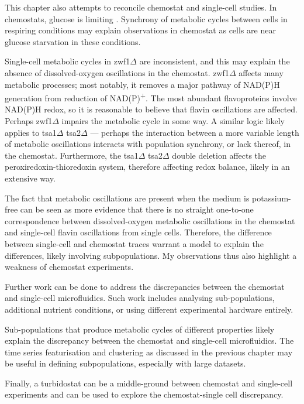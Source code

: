 This chapter also attempts to reconcile chemostat and single-cell studies.
In chemostats, glucose is limiting \parencite{jonesCyberneticModelGrowth1999}.
Synchrony of metabolic cycles between cells in respiring conditions may explain observations in chemostat as cells are near glucose starvation in these conditions.

Single-cell metabolic cycles in zwf1$\Delta$ are inconsistent, and this may explain the absence of dissolved-oxygen oscillations in the chemostat.
zwf1$\Delta$ affects many metabolic processes; most notably, it removes a major pathway of NAD(P)H generation from reduction of NAD(P)\textsuperscript{+}.
The most abundant flavoproteins involve NAD(P)H redox, so it is reasonable to believe that flavin oscillations are affected.
Perhaps zwf1$\Delta$ impairs the metabolic cycle in some way.
A similar logic likely applies to tsa1$\Delta$ tsa2$\Delta$ --- perhaps the interaction between a more variable length of metabolic oscillations interacts with population synchrony, or lack thereof, in the chemostat.
Furthermore, the tsa1$\Delta$ tsa2$\Delta$ double deletion affects the peroxiredoxin-thioredoxin system, therefore affecting redox balance, likely in an extensive way.

The fact that metabolic oscillations are present when the medium is potassium-free can be seen as more evidence that there is no straight one-to-one correspondence between dissolved-oxygen metabolic oscillations in the chemostat and single-cell flavin oscillations from single cells.
Therefore, the difference between single-cell and chemostat traces warrant a model to explain the differences, likely involving subpopulations.
My observations thus also highlight a weakness of chemostat experiments.




Further work can be done to address the discrepancies between the chemostat and single-cell microfluidics.
Such work includes analysing sub-populations, additional nutrient conditions, or using different experimental hardware entirely.

Sub-populations that produce metabolic cycles of different properties likely explain the discrepancy between the chemostat and single-cell microfluidics.
The time series featurisation and clustering as discussed in the previous chapter may be useful in defining subpopulations, especially with large datasets.

Finally, a turbidostat can be a middle-ground between chemostat and single-cell experiments and can be used to explore the chemostat-single cell discrepancy.
